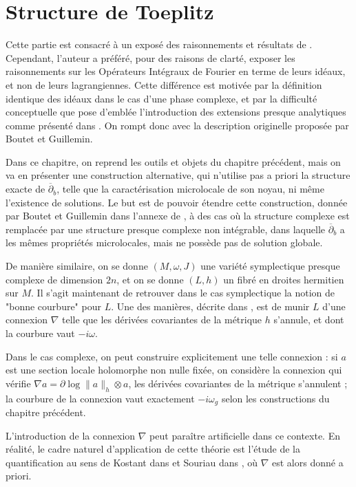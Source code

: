\chapter{Structure de Toeplitz}

Cette partie est consacré à un exposé des raisonnements et résultats de \cite{Shiffman2002}. Cependant, l'auteur a préféré, pour des raisons de clarté, exposer les raisonnements sur les Opérateurs Intégraux de Fourier en terme de leurs idéaux, et non de leurs lagrangiennes. Cette différence est motivée par la définition identique des idéaux dans le cas d'une phase complexe, et par la difficulté conceptuelle que pose d'emblée l'introduction des extensions presque analytiques comme présenté dans \cite{melin1975fourier}. On rompt donc avec la description originelle proposée par Boutet et Guillemin.

Dans ce chapitre, on reprend les outils et objets du chapitre précédent, mais on va en présenter une construction alternative, qui n'utilise pas a priori la structure exacte de $\overline{\partial}_b$, telle que la caractérisation microlocale de son noyau, ni même l'existence de solutions. Le but est de pouvoir étendre cette construction, donnée par Boutet et Guillemin dans l'annexe de \cite{BoutetdeMonvel1981}, à des cas où la structure complexe est remplacée par une structure presque complexe non intégrable, dans laquelle $\overline{\partial}_b$ a les mêmes propriétés microlocales, mais ne possède pas de solution globale.

De manière similaire, on se donne $(M,\omega, J)$ une variété symplectique presque complexe de dimension $2n$, et on se donne $(L,h)$ un fibré en droites hermitien sur $M$. Il s'agit maintenant de retrouver dans le cas symplectique la notion de "bonne courbure" pour $L$. Une des manières, décrite dans \cite{woodhouse1997geometric}, est de munir $L$ d'une connexion $\nabla$ telle que les dérivées covariantes de la métrique $h$ s'annule, et dont la courbure vaut $-i\omega$. 

Dans le cas complexe, on peut construire explicitement une telle connexion : si $a$ est une section locale holomorphe non nulle fixée, on considère la connexion qui vérifie $\nabla a = \partial \log \|a\|_h \otimes a$, les dérivées covariantes de la métrique s'annulent ; la courbure de la connexion vaut exactement $-i\omega_g$ selon les constructions du chapitre précédent.

\begin{rem}L'introduction de la connexion $\nabla$ peut paraître artificielle dans ce contexte. En réalité, le cadre naturel d'application de cette théorie est l'étude de la quantification au sens de Kostant dans \cite{kostant1970quantization} et Souriau dans \cite{souriau1967quantification}, où $\nabla$ est alors donné a priori.\end{rem}

